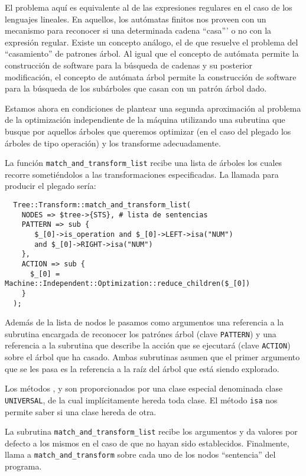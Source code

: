 El problema aquí es equivalente al de las expresiones regulares
en el caso de los lenguajes lineales. En aquellos, los autómatas finitos 
nos proveen con un mecanismo para reconocer si una determinada cadena
``casa''' o no con la expresión regular. Existe un concepto análogo,
el de  que resuelve el problema del ``casamiento''
de patrones árbol. Al igual que el concepto de autómata permite 
la construcción de software para la búsqueda de cadenas y su 
posterior modificación, el concepto de autómata árbol 
permite la construcción de software para la búsqueda de los
subárboles que casan con un patrón árbol dado.

Estamos ahora en condiciones de plantear una segunda aproximación
al problema de la optimización independiente de la máquina
utilizando una subrutina que busque por aquellos
árboles que queremos optimizar (en el caso del plegado 
los árboles de tipo operación) y los transforme 
adecuadamente. 

La función
\verb|match_and_transform_list| recibe una lista
de árboles los cuales recorre sometiéndolos 
a las transformaciones especificadas. La llamada para
producir el plegado sería:

\begin{verbatim}
  Tree::Transform::match_and_transform_list(
    NODES => $tree->{STS}, # lista de sentencias
    PATTERN => sub {
       $_[0]->is_operation and $_[0]->LEFT->isa("NUM") 
       and $_[0]->RIGHT->isa("NUM") 
    },
    ACTION => sub { 
      $_[0] = Machine::Independent::Optimization::reduce_children($_[0]) 
    }
  );
\end{verbatim}
Además de la lista de nodos le pasamos como argumentos una
referencia a la subrutina encargada de reconocer los patrónes
árbol (clave \verb|PATTERN|) y una referencia a la
subrutina que describe la acción que se ejecutará  (clave \verb|ACTION|) sobre 
el árbol que ha casado. Ambas subrutinas 
asumen que el primer argumento que se les pasa 
es la referencia a la raíz del árbol que está siendo explorado.

Los métodos ,  y  
son proporcionados por una clase especial denominada clase \verb|UNIVERSAL|,
de la cual implícitamente hereda toda clase. 
El método \verb|isa|  nos permite saber si una clase hereda de otra.

La subrutina \verb|match_and_transform_list|
recibe los argumentos y da valores por defecto a los mismos
en el caso de que no hayan sido establecidos.
Finalmente, llama a \verb|match_and_transform|
sobre cada uno de los nodos ``sentencia'' del programa.

